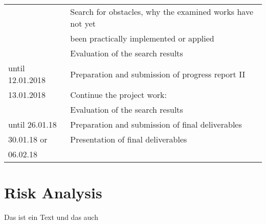 \documentclass[sigchi-a, authorversion]{acmart}
\begin{document}
\begin{table}[H]
\begin{tabular}{ll}
    & Search for obstacles, why the examined works have not yet \\
    & been practically implemented or applied\\
    & Evaluation of the search results \\
    \hline
    until 12.01.2018 & Preparation and submission of progress report II \\
    \hline
    13.01.2018 & Continue the project work: \\
    & Evaluation of the search results \\
    \hline
    until 26.01.18 & Preparation and submission of final deliverables \\
    \hline
    30.01.18 or & Presentation of final deliverables \\
    06.02.18 &  \\
    \bottomrule
  \end{tabular}
\end{table}

\section{Risk Analysis} %
Das ist ein Text \cite{DBLP:conf/conext/ValanciusLMDR09} und das auch \cite{DBLP:journals/sigmetrics/JalaliAVHAT14}



\end{document}
